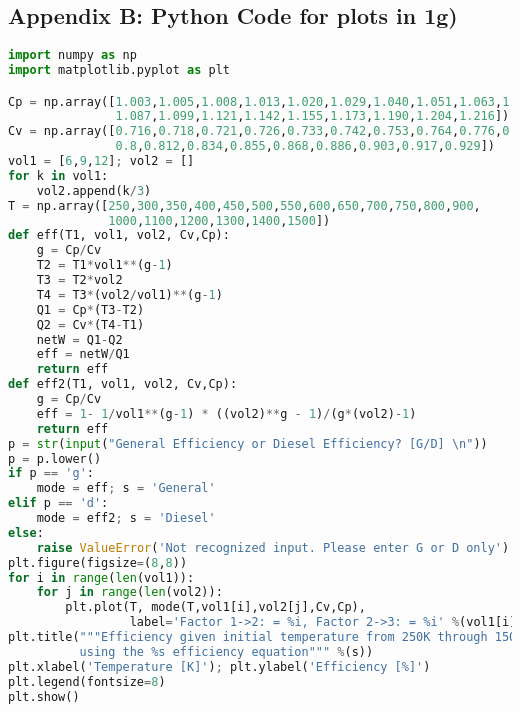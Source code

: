 \documentclass{article}
\begin{document}
\subsection*{Appendix B: Python Code for plots in 1g)}
\begin{lstlisting}[language=Python]
import numpy as np
import matplotlib.pyplot as plt

Cp = np.array([1.003,1.005,1.008,1.013,1.020,1.029,1.040,1.051,1.063,1.075,
               1.087,1.099,1.121,1.142,1.155,1.173,1.190,1.204,1.216])
Cv = np.array([0.716,0.718,0.721,0.726,0.733,0.742,0.753,0.764,0.776,0.788,
               0.8,0.812,0.834,0.855,0.868,0.886,0.903,0.917,0.929])
vol1 = [6,9,12]; vol2 = []
for k in vol1:
    vol2.append(k/3)
T = np.array([250,300,350,400,450,500,550,600,650,700,750,800,900,
              1000,1100,1200,1300,1400,1500])
def eff(T1, vol1, vol2, Cv,Cp):
    g = Cp/Cv
    T2 = T1*vol1**(g-1)
    T3 = T2*vol2
    T4 = T3*(vol2/vol1)**(g-1)
    Q1 = Cp*(T3-T2)
    Q2 = Cv*(T4-T1)
    netW = Q1-Q2
    eff = netW/Q1
    return eff
def eff2(T1, vol1, vol2, Cv,Cp):
    g = Cp/Cv
    eff = 1- 1/vol1**(g-1) * ((vol2)**g - 1)/(g*(vol2)-1)
    return eff
p = str(input("General Efficiency or Diesel Efficiency? [G/D] \n"))
p = p.lower()
if p == 'g':
    mode = eff; s = 'General'
elif p == 'd':
    mode = eff2; s = 'Diesel'
else:
    raise ValueError('Not recognized input. Please enter G or D only')
plt.figure(figsize=(8,8))
for i in range(len(vol1)):
    for j in range(len(vol2)):
        plt.plot(T, mode(T,vol1[i],vol2[j],Cv,Cp),
                 label='Factor 1->2: = %i, Factor 2->3: = %i' %(vol1[i],vol2[j]))
plt.title("""Efficiency given initial temperature from 250K through 1500K 
          using the %s efficiency equation""" %(s))
plt.xlabel('Temperature [K]'); plt.ylabel('Efficiency [%]')
plt.legend(fontsize=8)
plt.show()
\end{lstlisting}
\end{document}
